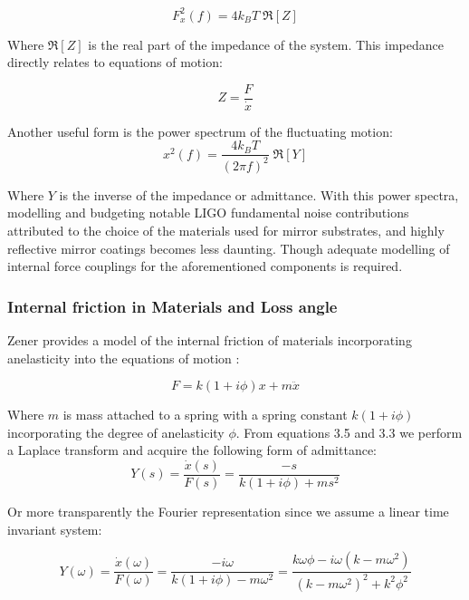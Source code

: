 \begin{equation}
F_x^2(f) = 4 k_B T\; \Re[Z]
\end{equation}

 \noindent Where $\Re[Z]$ is the real part of the impedance of the system. This impedance directly relates to equations of motion:

 \begin{equation}
 Z = \frac{F}{\dot{x}}
 \end{equation}

\noindent Another useful form is the power spectrum of the fluctuating motion:
\begin{equation}\label{fdtpsd}
x^2 (f)  = \frac{4k_B T}{(2 \pi f)^2}\; \Re[Y]
\end{equation}

Where $Y$ is the inverse of the impedance or admittance. With this power spectra, modelling and budgeting notable LIGO fundamental noise contributions attributed to the choice of the materials used for mirror substrates, and highly reflective mirror coatings becomes less daunting. Though adequate modelling of internal force couplings for the aforementioned components is required.

\subsubsection{Internal friction in Materials and Loss angle}

Zener provides a model of the internal friction of materials incorporating anelasticity into the equations of motion \cite{zener:1948}:

\begin{equation}
F = k(1+i\phi)x + m\ddot{x}
\end{equation}

Where $m$ is mass attached to a spring with a spring constant $k(1+ i\phi)$ incorporating the degree of anelasticity $\phi$. From equations 3.5 and 3.3 we perform a Laplace transform and acquire the following form of admittance:
\begin{equation}
Y(s) = \frac{\dot{x}(s)}{F(s)} = \frac{-s}{k(1+i\phi) + ms^2}
\end{equation}

\noindent Or more transparently the Fourier representation since we assume a linear time invariant system:

\begin{equation}\label{admitint}
Y(\omega) = \frac{\dot{x}(\omega)}{F(\omega)} = \frac{-i\omega}{k(1+i\phi) - m\omega^2} = \frac{k \omega \phi - i \omega (k - m \omega^2)}{(k-m\omega^2)^2 +k^2 \phi^2}
\end{equation}

